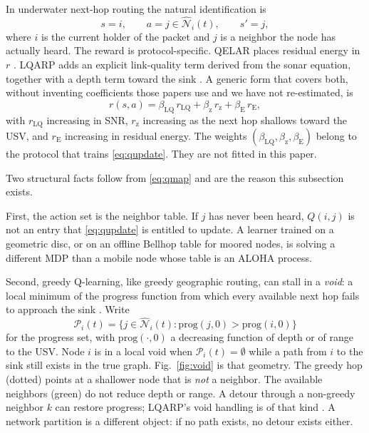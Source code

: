 \documentclass[journal]{IEEEtran}
\begin{document}
In underwater next-hop routing the natural identification is
\cite{hu2010qelar,liu2026lqarp}
\begin{equation}
s=i,\qquad
a=j\in\widehat{\mathcal{N}}_{i}(t),\qquad
s'=j,
\label{eq:qmap}
\end{equation}
where $i$ is the current holder of the packet and $j$ is a neighbor
the node has actually heard.
The reward is protocol-specific.
QELAR places residual energy in $r$ \cite{hu2010qelar}.
LQARP adds an explicit link-quality term derived from the sonar
equation, together with a depth term toward the sink
\cite{liu2026lqarp}.
A generic form that covers both, without inventing coefficients
those papers use and we have not re-estimated, is
\begin{equation}
r(s,a)=
\beta_{\mathrm{LQ}}\,r_{\mathrm{LQ}}
+\beta_{\mathrm{z}}\,r_{\mathrm{z}}
+\beta_{\mathrm{E}}\,r_{\mathrm{E}},
\label{eq:qrew}
\end{equation}
with $r_{\mathrm{LQ}}$ increasing in SNR,
$r_{\mathrm{z}}$ increasing as the next hop shallows toward the
USV, and $r_{\mathrm{E}}$ increasing in residual energy.
The weights $(\beta_{\mathrm{LQ}},\beta_{\mathrm{z}},\beta_{\mathrm{E}})$
belong to the protocol that trains \eqref{eq:qupdate}.
They are not fitted in this paper.

Two structural facts follow from \eqref{eq:qmap} and are the reason
this subsection exists.

First, the action set is the neighbor table.
If $j$ has never been heard, $Q(i,j)$ is not an entry that
\eqref{eq:qupdate} is entitled to update.
A learner trained on a geometric disc, or on an offline Bellhop
table for moored nodes, is solving a different MDP than a mobile
node whose table is an ALOHA process.

Second, greedy Q-learning, like greedy geographic routing, can
stall in a \emph{void}: a local minimum of the progress function
from which every available next hop fails to approach the sink
\cite{noh2013vapr,coutinho2014gedar,yan2008dbr}.
Write
\begin{equation}
\mathcal{P}_{i}(t)=
\bigl\{j\in\widehat{\mathcal{N}}_{i}(t):
\mathrm{prog}(j,0)>\mathrm{prog}(i,0)\bigr\}
\label{eq:progress}
\end{equation}
for the progress set, with $\mathrm{prog}(\cdot,0)$ a decreasing
function of depth or of range to the USV.
Node $i$ is in a local void when $\mathcal{P}_{i}(t)=\emptyset$
while a path from $i$ to the sink still exists in the true graph.
Fig.~\ref{fig:void} is that geometry.
The greedy hop (dotted) points at a shallower node that is
\emph{not} a neighbor.
The available neighbors (green) do not reduce depth or range.
A detour through a non-greedy neighbor $k$ can restore progress;
LQARP's void handling is of that kind \cite{liu2026lqarp}.
A network partition is a different object: if no path exists, no
detour exists either.
\end{document}

